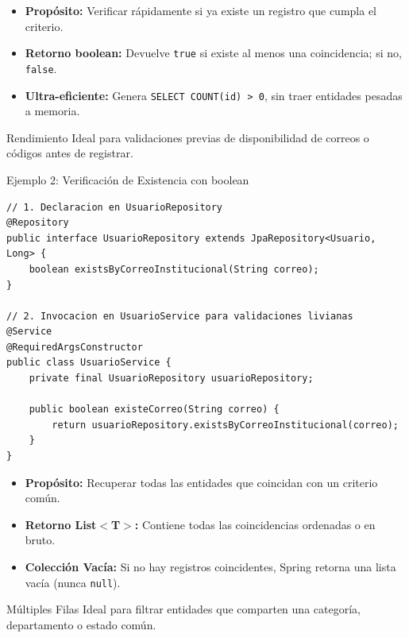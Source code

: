 \documentclass[aspectratio=169]{beamer}
\begin{document}
  {
    \begin{itemize}
      \item \textbf{Prop\'osito:} Verificar r\'apidamente si ya existe un registro que cumpla el criterio.
      \item \textbf{Retorno boolean:} Devuelve \texttt{true} si existe al menos una coincidencia; si no, \texttt{false}.
      \item \textbf{Ultra-eficiente:} Genera \texttt{SELECT COUNT(id) > 0}, sin traer entidades pesadas a memoria.
    \end{itemize}
  }
  {Rendimiento}
  {Ideal para validaciones previas de disponibilidad de correos o c\'odigos antes de registrar.}

\begin{frame}[fragile]{Ejemplo 2: Verificaci\'on de Existencia con boolean}
\begin{lstlisting}[style=SpringCodeStyle]
// 1. Declaracion en UsuarioRepository
@Repository
public interface UsuarioRepository extends JpaRepository<Usuario, Long> {
    boolean existsByCorreoInstitucional(String correo);
}

// 2. Invocacion en UsuarioService para validaciones livianas
@Service
@RequiredArgsConstructor
public class UsuarioService {
    private final UsuarioRepository usuarioRepository;

    public boolean existeCorreo(String correo) {
        return usuarioRepository.existsByCorreoInstitucional(correo);
    }
}
\end{lstlisting}
\end{frame}

  {
    \begin{itemize}
      \item \textbf{Prop\'osito:} Recuperar todas las entidades que coincidan con un criterio com\'un.
      \item \textbf{Retorno List$<$T$>$:} Contiene todas las coincidencias ordenadas o en bruto.
      \item \textbf{Colecci\'on Vac\'ia:} Si no hay registros coincidentes, Spring retorna una lista vac\'ia (nunca \texttt{null}).
    \end{itemize}
  }
  {M\'ultiples Filas}
  {Ideal para filtrar entidades que comparten una categor\'ia, departamento o estado com\'un.}
\end{document}
